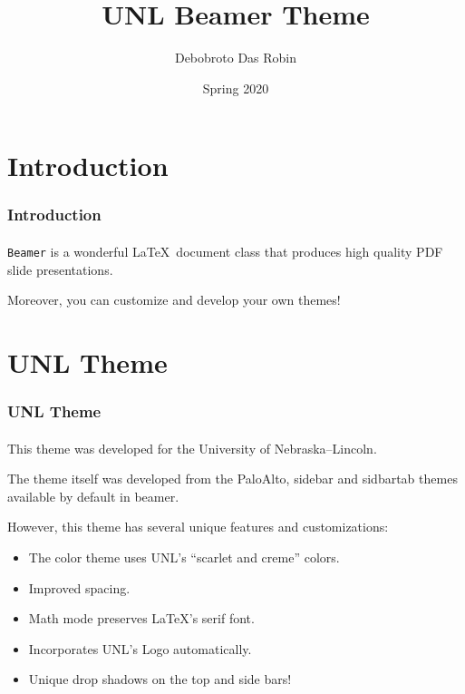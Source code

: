 \documentclass{beamer}
\title{UNL Beamer Theme}
\author{Debobroto Das Robin} %
\institute{Kent State University}
\date{Spring 2020}
\begin{document}
\begin{frame}
        \titlepage
        \begin{center}
    \href{mailto:drobin@kent.edu}{}
        \end{center}
\end{frame}


\section{Introduction}

\begin{frame}
    \frametitle{Introduction}
    \framesubtitle{}

    \texttt{Beamer} is a wonderful \LaTeX\ document class that produces
    high quality PDF slide presentations.
    
    Moreover, you can customize and develop your own themes!

\end{frame}

\section{UNL Theme}    

\begin{frame}
    \frametitle{UNL Theme}
    \framesubtitle{}

    This theme was developed for the University of Nebraska--Lincoln.
    
    The theme itself was developed from the PaloAlto, sidebar and sidbartab
    themes available by default in beamer.
    
    However, this theme has several unique features and customizations:
    \begin{itemize}
      \item The color theme uses UNL's ``scarlet and creme'' colors.
      \item Improved spacing.
      \item Math mode preserves \LaTeX's serif font.
      \item Incorporates UNL's Logo automatically.
      \item Unique drop shadows on the top and side bars!
    \end{itemize}

\end{frame}
\end{document}
